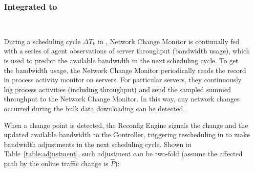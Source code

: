 {%

\subsubsection{Integrated to \name}
\ 

During a scheduling cycle $\Delta T_k$ in \name, Network Change Monitor is continually fed with a series of agent observations of server throughput (bandwidth usage), which is used to predict the available bandwidth in the next scheduling cycle. To get the bandwidth usage, the Network Change Monitor periodically reads the record in process activity monitor on servers. For particular servers, they continuously log process activities (including throughput) and send the sampled summed throughput to the Network Change Monitor. In this way, any network changes occurred during the bulk data downloading can be detected.


 When a change point is detected, the Reconfig Engine signals the change and the updated available bandwidth to the Controller, triggering rescheduling in \newname to make bandwidth adjustments in the next scheduling cycle. Shown in Table~\ref{table:adjustment}, such adjustment can be two-fold (assume the affected path by the online traffic change is $\hat{P}$):

\begin{table}[t]
\begin{center}
\end{center}
\caption{}
\label{table:adjustment}
\end{table}

}
